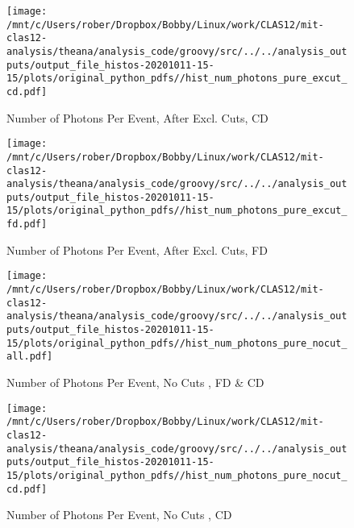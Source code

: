 \documentclass{article}
\begin{document}
\begin{landscape}
    \begin{figure}[h]
        \centering

        \texttt{[image: /mnt/c/Users/rober/Dropbox/Bobby/Linux/work/CLAS12/mit-clas12-analysis/theana/analysis\_code/groovy/src/../../analysis\_outputs/output\_file\_histos-20201011-15-15/plots/original\_python\_pdfs//hist\_num\_photons\_pure\_excut\_cd.pdf]}
        \captionsetup{textformat=empty,labelformat=blank}
        \caption{Number of Photons Per Event, After Excl. Cuts, CD}
    \end{figure}
    \clearpage
    
    \begin{figure}[h]
        \centering

        \texttt{[image: /mnt/c/Users/rober/Dropbox/Bobby/Linux/work/CLAS12/mit-clas12-analysis/theana/analysis\_code/groovy/src/../../analysis\_outputs/output\_file\_histos-20201011-15-15/plots/original\_python\_pdfs//hist\_num\_photons\_pure\_excut\_fd.pdf]}
        \captionsetup{textformat=empty,labelformat=blank}
        \caption{Number of Photons Per Event, After Excl. Cuts, FD}
    \end{figure}
    \clearpage
    
    \begin{figure}[h]
        \centering

        \texttt{[image: /mnt/c/Users/rober/Dropbox/Bobby/Linux/work/CLAS12/mit-clas12-analysis/theana/analysis\_code/groovy/src/../../analysis\_outputs/output\_file\_histos-20201011-15-15/plots/original\_python\_pdfs//hist\_num\_photons\_pure\_nocut\_all.pdf]}
        \captionsetup{textformat=empty,labelformat=blank}
        \caption{Number of Photons Per Event, No Cuts , FD \& CD}
    \end{figure}
    \clearpage
    
    \begin{figure}[h]
        \centering

        \texttt{[image: /mnt/c/Users/rober/Dropbox/Bobby/Linux/work/CLAS12/mit-clas12-analysis/theana/analysis\_code/groovy/src/../../analysis\_outputs/output\_file\_histos-20201011-15-15/plots/original\_python\_pdfs//hist\_num\_photons\_pure\_nocut\_cd.pdf]}
        \captionsetup{textformat=empty,labelformat=blank}
        \caption{Number of Photons Per Event, No Cuts , CD}
    \end{figure}
    \clearpage
    
    \begin{figure}[h]
        \centering


\end{figure}
\end{landscape}
\end{document}
